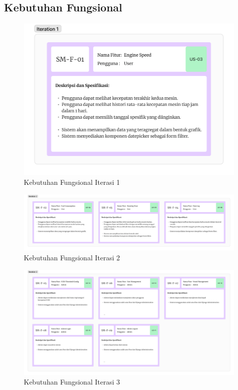 \begin{landscape}

    \subsection{Kebutuhan Fungsional}

    \begin{figure}[!h]
        \includegraphics[width=.6\linewidth, center]{images/lampiran/fr/fr-it1.png}
        \caption{Kebutuhan Fungsional Iterasi 1}
        \label{fig:fr-it1}
    \end{figure}

    \begin{figure}[!h]
        \includegraphics[width=1.1\linewidth, center]{images/lampiran/fr/fr-it2.png}
        \caption{Kebutuhan Fungsional Iterasi 2}
        \label{fig:fr-it2}
    \end{figure}

    \begin{figure}[!h]
        \includegraphics[width=1\linewidth, center]{images/lampiran/fr/fr-it3.png}
        \caption{Kebutuhan Fungsional Iterasi 3}
        \label{fig:fr-it3}
    \end{figure}


\end{landscape}
